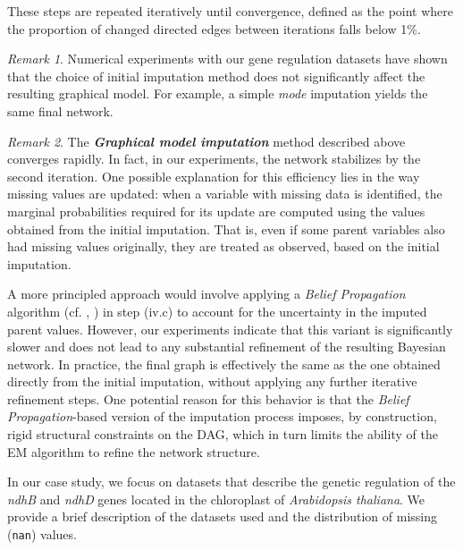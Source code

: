 \documentclass[
]{article}
\theoremstyle{definition}
\theoremstyle{remark}
\newtheorem{refremark}{Remark}[section]
\begin{document}
These steps are repeated iteratively until convergence, defined as the
point where the proportion of changed directed edges between iterations
falls below 1\%.

\begin{refremark}
Numerical experiments with our gene regulation datasets have shown that
the choice of initial imputation method does not significantly affect
the resulting graphical model. For example, a simple \emph{mode}
imputation yields the same final network.

\label{rem-init_imp}

\end{refremark}

\begin{refremark}
The \textbf{\emph{Graphical model imputation}} method described above
converges rapidly. In fact, in our experiments, the network stabilizes
by the second iteration. One possible explanation for this efficiency
lies in the way missing values are updated: when a variable with missing
data is identified, the marginal probabilities required for its update
are computed using the values obtained from the initial imputation. That
is, even if some parent variables also had missing values originally,
they are treated as observed, based on the initial imputation.

A more principled approach would involve applying a \emph{Belief
Propagation} algorithm (cf.
,
) in step (iv.c) to account for the
uncertainty in the imputed parent values. However, our experiments
indicate that this variant is significantly slower and does not lead to
any substantial refinement of the resulting Bayesian network. In
practice, the final graph is effectively the same as the one obtained
directly from the initial imputation, without applying any further
iterative refinement steps. One potential reason for this behavior is
that the \emph{Belief Propagation}-based version of the imputation
process imposes, by construction, rigid structural constraints on the
DAG, which in turn limits the ability of the EM algorithm to refine the
network structure.

\label{rem-Belief_Prop}

\end{refremark}

In our case study, we focus on datasets that describe the genetic
regulation of the \emph{ndhB} and \emph{ndhD} genes located in the
chloroplast of \emph{Arabidopsis thaliana}. We provide a brief
description of the datasets used and the distribution of missing
(\texttt{nan}) values.
\end{document}
